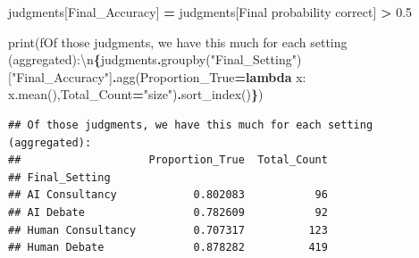 \documentclass[
]{article}
\newenvironment{Shaded}{\begin{snugshade}}{\end{snugshade}}
\newcommand{\BuiltInTok}[1]{#1}
\newcommand{\CharTok}[1]{\textcolor[rgb]{0.31,0.60,0.02}{#1}}
\newcommand{\FloatTok}[1]{\textcolor[rgb]{0.00,0.00,0.81}{#1}}
\newcommand{\KeywordTok}[1]{\textcolor[rgb]{0.13,0.29,0.53}{\textbf{#1}}}
\newcommand{\NormalTok}[1]{#1}
\newcommand{\OperatorTok}[1]{\textcolor[rgb]{0.81,0.36,0.00}{\textbf{#1}}}
\newcommand{\SpecialCharTok}[1]{\textcolor[rgb]{0.81,0.36,0.00}{\textbf{#1}}}
\newcommand{\SpecialStringTok}[1]{\textcolor[rgb]{0.31,0.60,0.02}{#1}}
\newcommand{\StringTok}[1]{\textcolor[rgb]{0.31,0.60,0.02}{#1}}
\begin{document}
\begin{Shaded}
\begin{Highlighting}[]
\NormalTok{judgments[}\StringTok{\textquotesingle{}Final\_Accuracy\textquotesingle{}}\NormalTok{] }\OperatorTok{=}\NormalTok{ judgments[}\StringTok{\textquotesingle{}Final probability correct\textquotesingle{}}\NormalTok{] }\OperatorTok{\textgreater{}} \FloatTok{0.5}

\BuiltInTok{print}\NormalTok{(}\SpecialStringTok{f\textquotesingle{}Of those judgments, we have this much for each setting (aggregated):}\CharTok{\textbackslash{}n}\SpecialCharTok{\{}\NormalTok{judgments}\SpecialCharTok{.}\NormalTok{groupby(}\StringTok{"Final\_Setting"}\NormalTok{)[}\StringTok{"Final\_Accuracy"}\NormalTok{]}\SpecialCharTok{.}\NormalTok{agg(Proportion\_True}\OperatorTok{=}\KeywordTok{lambda}\NormalTok{ x: x.mean(),Total\_Count}\OperatorTok{=}\StringTok{"size"}\NormalTok{)}\SpecialCharTok{.}\NormalTok{sort\_index()}\SpecialCharTok{\}}\SpecialStringTok{\textquotesingle{}}\NormalTok{)}
\end{Highlighting}
\end{Shaded}

\begin{verbatim}
## Of those judgments, we have this much for each setting (aggregated):
##                    Proportion_True  Total_Count
## Final_Setting                                  
## AI Consultancy            0.802083           96
## AI Debate                 0.782609           92
## Human Consultancy         0.707317          123
## Human Debate              0.878282          419
\end{verbatim}
\end{document}
